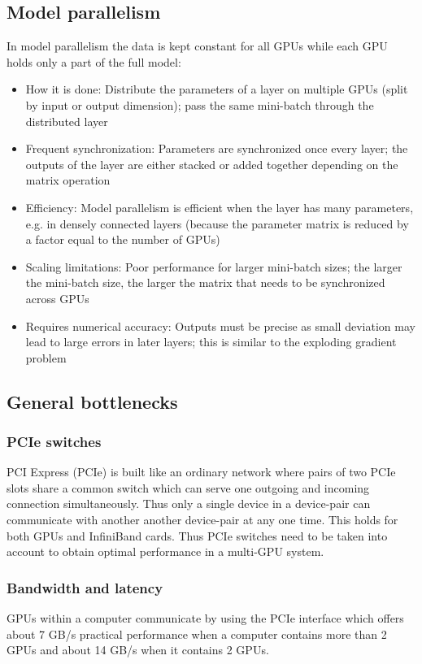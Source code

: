 \documentclass{article} %
\begin{document}
\subsection{Model parallelism}
In model parallelism the data is kept constant for all GPUs while each GPU holds only a part of the full model:
\begin{itemize}
	\item How it is done: Distribute the parameters of a layer on multiple GPUs (split by input or output dimension); pass the same mini-batch through the distributed layer
	\item Frequent synchronization: Parameters are synchronized once every layer; the outputs of the layer are either stacked or added together depending on the matrix operation
	\item Efficiency: Model parallelism is efficient when the layer has many parameters, e.g. in densely connected layers (because the parameter matrix is reduced by a factor equal to the number of GPUs)
	\item Scaling limitations: Poor performance for larger mini-batch sizes; the larger the mini-batch size, the larger the matrix that needs to be synchronized across GPUs
	\item Requires numerical accuracy: Outputs must be precise as small deviation may lead to large errors in later layers; this is similar to the exploding gradient problem \citep{hochreiter2001gradient}
\end{itemize}

\subsection{General bottlenecks}

\subsubsection{PCIe switches}

PCI Express (PCIe) is built like an ordinary network where pairs of two PCIe slots share a common switch which can serve one outgoing and incoming connection simultaneously. Thus only a single device in a device-pair can communicate with another another device-pair at any one time. This holds for both GPUs and InfiniBand cards. Thus PCIe switches need to be taken into account to obtain optimal performance in a multi-GPU system.

\subsubsection{Bandwidth and latency}
GPUs within a computer communicate by using the PCIe interface which offers about 7 GB/s practical performance when a computer contains more than 2 GPUs and about 14 GB/s when it contains 2 GPUs. 
\end{document}
